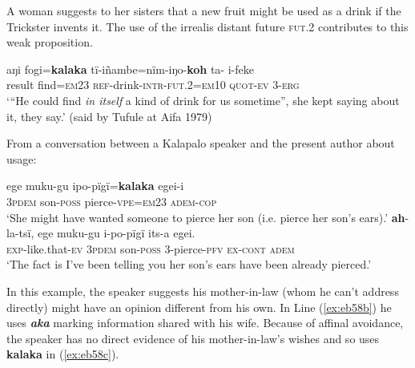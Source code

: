 \documentclass[output=paper]{langsci/langscibook}
\begin{document}
A woman suggests to her sisters that a new fruit might be used as a drink if the Trickster invents it. The use of the irrealis distant future \textsc{fut}.2 contributes to this weak proposition. 

\begin{exe}
	\ex \label{ex:eb56}
	\gll aŋi fogi=\textbf{kalaka} tï-iñambe=nïm-iŋo-\textbf{koh} ta- i-feke\\
	result find=\textsc{em23} \textsc{ref}-drink-\textsc{intr-fut.2=em10} \textsc{quot-ev} 3-\textsc{erg}\\
	\trans `“He could find \textit{in itself}  a kind of drink for us sometime”, she kept saying about it, they say.’ (said by Tufule at Aifa 1979)
\end{exe}

From a conversation between a Kalapalo speaker and the present author about usage:

\begin{exe}
\ex \label{ex:eb57}
	\begin{xlist}
	\ex 
	\gll ege muku-gu ipo-pïgï=\textbf{kalaka} egei-i\\
	3\textsc{pdem} son-\textsc{poss} pierce-\textsc{vpe=em23} \textsc{adem-cop}\\
	\trans ‘She might have wanted someone to pierce her son (i.e. pierce her son’s ears).’
	\ex 
	\gll \textbf{ah}-la-tsï, ege muku-gu i-po-pïgï its-a egei.\\
	\textsc{exp}-like.that-\textsc{ev} 3\textsc{pdem} son-\textsc{poss} 3-pierce-\textsc{pfv} \textsc{ex-cont} \textsc{adem}\\
	\trans ‘The fact is I’ve been telling you her son’s ears have been already pierced.’
\end{xlist}
\end{exe}

In this example,  the speaker suggests his mother-in-law (whom he can’t address directly)  might have an opinion different from his own.  In Line (\ref{ex:eb58b}) he uses \textbf{\textit{aka}} marking information shared with his wife. Because of affinal avoidance, the speaker has no direct evidence of his mother-in-law’s wishes and so uses \textbf{kalaka} in (\ref{ex:eb58c}).
\end{document}
